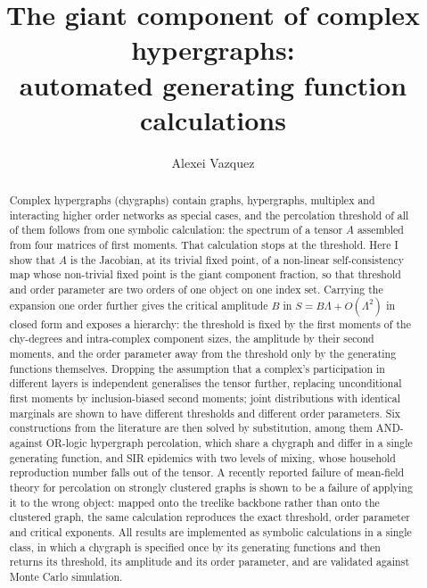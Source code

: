 \documentclass[aps,pre,twocolumn,superscriptaddress,floatfix,longbibliography]{revtex4-2}
\begin{document}
\title{The giant component of complex hypergraphs:\\
automated generating function calculations}

\author{Alexei Vazquez}

\begin{abstract}
Complex hypergraphs (chygraphs) contain graphs, hypergraphs, multiplex and
interacting higher order networks as special cases, and the percolation
threshold of all of them follows from one symbolic calculation: the spectrum of
a tensor $A$ assembled from four matrices of first moments. That calculation
stops at the threshold. Here I show that $A$ is the Jacobian, at its trivial
fixed point, of a non-linear self-consistency map whose non-trivial fixed point
is the giant component fraction, so that threshold and order parameter are two
orders of one object on one index set. Carrying the expansion one order further
gives the critical amplitude $B$ in $S=B\Lambda+O(\Lambda^2)$ in closed form
and exposes a hierarchy: the threshold is fixed by the first moments of the
chy-degrees and intra-complex component sizes, the amplitude by their second
moments, and the order parameter away from the threshold only by the generating
functions themselves. Dropping the assumption that a complex's participation in
different layers is independent generalises the tensor further, replacing
unconditional first moments by inclusion-biased second moments; joint
distributions with identical marginals are shown to have different thresholds
and different order parameters. Six constructions from the literature are then
solved by substitution, among them AND- against OR-logic hypergraph percolation,
which share a chygraph and differ in a single generating function, and SIR
epidemics with two levels of mixing, whose household reproduction number falls
out of the tensor. A recently reported failure of mean-field theory for
percolation on strongly clustered graphs is shown to be a failure of applying it
to the wrong object: mapped onto the treelike backbone rather than onto the
clustered graph, the same calculation reproduces the exact threshold, order
parameter and critical exponents. All results are implemented as symbolic
calculations in a single class, in which a chygraph is specified once by its
generating functions and then returns its threshold, its amplitude and its order
parameter, and are validated against Monte Carlo simulation.
\end{abstract}
\end{document}
